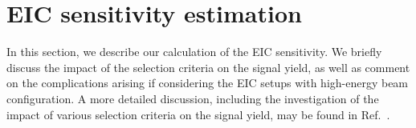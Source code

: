 \documentclass[aps,prd,preprintnumbers,superscriptaddress,nofootinbib,floatfix,twocolumn,notitlepage,reprint]{revtex4-2}
\begin{document}
\section{EIC sensitivity estimation}
\label{app:event-selection}

In this section, we describe our calculation of the EIC sensitivity. 
We briefly discuss the impact of the selection criteria on the signal yield, as well as comment on the complications arising if considering the EIC setups with high-energy beam configuration. 
A more detailed discussion, including the investigation of the impact of various selection criteria on the signal yield, may be found in Ref.~\cite{Balkin:2026whv}.
\end{document}
